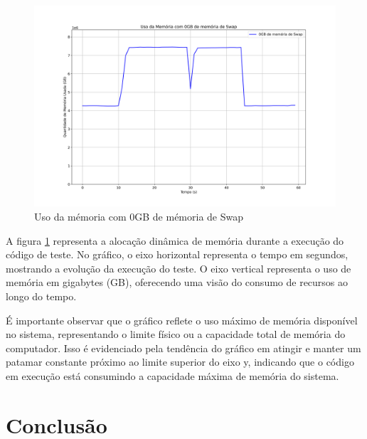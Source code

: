 \documentclass[
	12pt,				%
	openright,			%
	oneside,			%
	a4paper,			%
	chapter=TITLE,		%
	english,			%
	french,				%
	spanish,			%
	brazil				%
	]{abntex2}
\theoremstyle{definition}
\begin{document}
\begin{figure}[H]
	\centering
	\includegraphics[width=1.0\textwidth]{0gb_swap.png}
	\caption{Uso da mémoria com 0GB de mémoria de Swap}
	\label{fig:testes_swap0}
\end{figure}

A figura \ref{fig:testes_swap0} representa a alocação dinâmica de memória durante a execução
do código de teste. No gráfico, o eixo horizontal representa o tempo em segundos, mostrando a evolução da execução do teste. 
O eixo vertical representa o uso de memória em gigabytes (GB), oferecendo uma visão do consumo de recursos ao longo do tempo.

É importante observar que o gráfico reflete o uso máximo de memória disponível no sistema, representando o limite físico ou a capacidade 
total de memória do computador. Isso é evidenciado pela tendência do gráfico em atingir e manter um patamar constante próximo 
ao limite superior do eixo y, indicando que o código em execução está consumindo a capacidade máxima de memória do sistema.

\chapter{Conclusão}
\label{conclusao}


\postextual







\end{document}
